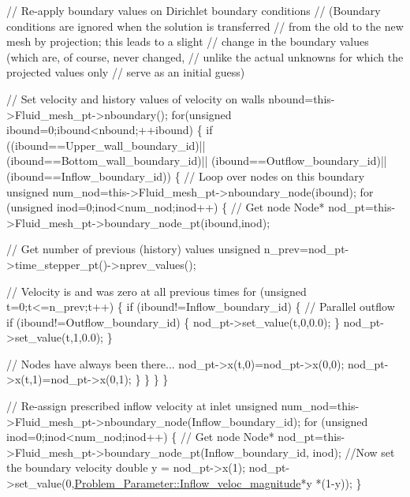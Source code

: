 \begin{DoxyCodeInclude}
 \textcolor{comment}{// Re-apply boundary values on Dirichlet boundary conditions }
 \textcolor{comment}{// (Boundary conditions are ignored when the solution is transferred}
 \textcolor{comment}{// from the old to the new mesh by projection; this leads to a slight}
 \textcolor{comment}{// change in the boundary values (which are, of course, never changed,}
 \textcolor{comment}{// unlike the actual unknowns for which the projected values only}
 \textcolor{comment}{// serve as an initial guess)}
 
 \textcolor{comment}{// Set velocity and history values of velocity on walls}
 nbound=this->Fluid\_mesh\_pt->nboundary();
 \textcolor{keywordflow}{for}(\textcolor{keywordtype}{unsigned} ibound=0;ibound<nbound;++ibound)
  \{
   \textcolor{keywordflow}{if} ((ibound==Upper\_wall\_boundary\_id)||
       (ibound==Bottom\_wall\_boundary\_id)||
       (ibound==Outflow\_boundary\_id)||
       (ibound==Inflow\_boundary\_id))
    \{
     \textcolor{comment}{// Loop over nodes on this boundary}
     \textcolor{keywordtype}{unsigned} num\_nod=this->Fluid\_mesh\_pt->nboundary\_node(ibound);
     \textcolor{keywordflow}{for} (\textcolor{keywordtype}{unsigned} inod=0;inod<num\_nod;inod++)
      \{
       \textcolor{comment}{// Get node}
       Node* nod\_pt=this->Fluid\_mesh\_pt->boundary\_node\_pt(ibound,inod);
       
       \textcolor{comment}{// Get number of previous (history) values}
       \textcolor{keywordtype}{unsigned} n\_prev=nod\_pt->time\_stepper\_pt()->nprev\_values();
       
       \textcolor{comment}{// Velocity is and was zero at all previous times}
       \textcolor{keywordflow}{for} (\textcolor{keywordtype}{unsigned} t=0;t<=n\_prev;t++)
        \{
         \textcolor{keywordflow}{if} (ibound!=Inflow\_boundary\_id)
          \{
           \textcolor{comment}{// Parallel outflow}
           \textcolor{keywordflow}{if} (ibound!=Outflow\_boundary\_id)
            \{
             nod\_pt->set\_value(t,0,0.0); 
            \}
           nod\_pt->set\_value(t,1,0.0);
          \}
         
         \textcolor{comment}{// Nodes have always been there...}
         nod\_pt->x(t,0)=nod\_pt->x(0,0);
         nod\_pt->x(t,1)=nod\_pt->x(0,1);
        \}
      \}
    \}
  \}
 
 \textcolor{comment}{// Re-assign prescribed inflow velocity at inlet}
 \textcolor{keywordtype}{unsigned} num\_nod=this->Fluid\_mesh\_pt->nboundary\_node(Inflow\_boundary\_id);
 \textcolor{keywordflow}{for} (\textcolor{keywordtype}{unsigned} inod=0;inod<num\_nod;inod++)
  \{
   \textcolor{comment}{// Get node}
   Node* nod\_pt=this->Fluid\_mesh\_pt->boundary\_node\_pt(Inflow\_boundary\_id,
                                                      inod);
   \textcolor{comment}{//Now set the boundary velocity}
   \textcolor{keywordtype}{double} y = nod\_pt->x(1); 
   nod\_pt->set\_value(0,\hyperlink{namespaceProblem__Parameter_a7792613e563a733ad88b8e15d126fc3a}{Problem\_Parameter::Inflow\_veloc\_magnitude}*y
      *(1-y));
  \}


\end{DoxyCodeInclude}
